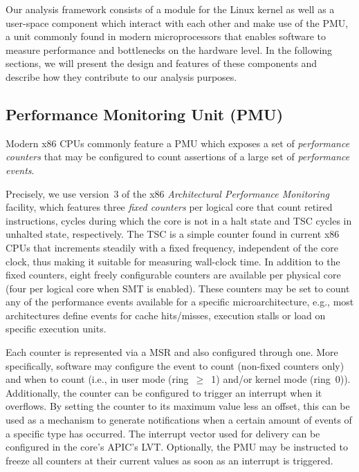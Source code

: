 Our analysis framework consists of a module for the Linux kernel as well as a user-space component which interact with each other and make use of the \gls{PMU}, a unit commonly found in modern microprocessors that enables software to measure performance and bottlenecks on the hardware level. In the following sections, we will present the design and features of these components and describe how they contribute to our analysis purposes.

\subsection{Performance Monitoring Unit (PMU)}
\label{sec:analysis:design:pmu}
Modern x86 \glspl{CPU} commonly feature a \gls{PMU} \cite{intelsdmsysprogguide} which exposes a set of \textit{performance counters} that may be configured to count assertions of a large set of \textit{performance events}.

Precisely, we use version~3 of the x86 \textit{Architectural Performance Monitoring} facility, which features three \textit{fixed counters} per logical core that count retired instructions, cycles during which the core is not in a halt state and \gls{TSC} cycles in unhalted state, respectively. The \gls{TSC} is a simple counter found in current x86 \glspl{CPU} that increments steadily with a fixed frequency, independent of the core clock, thus making it suitable for measuring wall-clock time. In addition to the fixed counters, eight freely configurable counters are available per physical core (four per logical core when \gls{SMT} is enabled). These counters may be set to count any of the performance events available for a specific microarchitecture, e.g., most architectures define events for cache hits/misses, execution stalls or load on specific execution units.

Each counter is represented via a \gls{MSR} and also configured through one. More specifically, software may configure the event to count (non-fixed counters only) and when to count (i.e., in user mode (ring~$\geq$~1) and/or kernel mode (ring~0)). Additionally, the counter can be configured to trigger an interrupt when it overflows. By setting the counter to its maximum value less an offset, this can be used as a mechanism to generate notifications when a certain amount of events of a specific type has occurred. The interrupt vector used for delivery can be configured in the core's \gls{APIC}'s \gls{LVT}. Optionally, the \gls{PMU} may be instructed to freeze all counters at their current values as soon as an interrupt is triggered.

